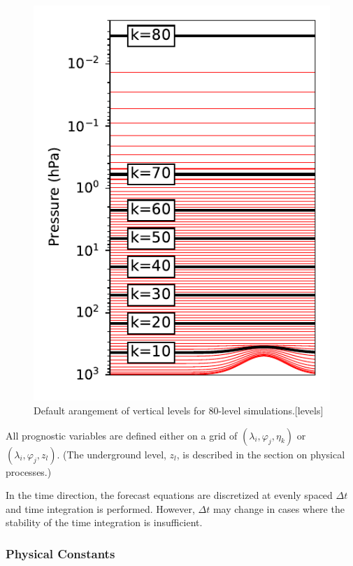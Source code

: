 \begin{figure}
\hypertarget{levels}{%
\centering
\includegraphics{levels.pdf}
\caption{Default arangement of vertical levels for 80-level simulations.\protect\hypertarget{levels}{}{{[}levels{]}}}\label{levels}
}
\end{figure}

All prognostic variables are defined either on a grid of \((\lambda_i, \varphi_j, \eta_k)\) or \((\lambda_i, \varphi_j, z_l)\). (The underground level, \(z_l\), is described in the section on physical
processes.)

In the time direction, the forecast equations are discretized at evenly spaced \(\Delta t\) and time integration is performed. However, \(\Delta t\) may change in cases where the stability of the time
integration is insufficient.

\hypertarget{physical-constants}{%
\subsubsection{Physical Constants}\label{physical-constants}}

